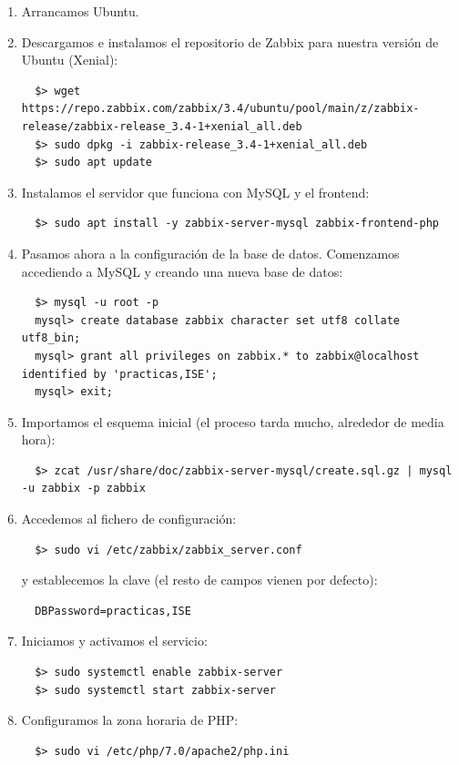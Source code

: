 \documentclass[12pt,spanish]{article}
\begin{document}
\begin{enumerate}
  \item Arrancamos Ubuntu.
  \item Descargamos e instalamos el repositorio de Zabbix para nuestra versión de Ubuntu (Xenial):
  \begin{lstlisting}
  $> wget https://repo.zabbix.com/zabbix/3.4/ubuntu/pool/main/z/zabbix-release/zabbix-release_3.4-1+xenial_all.deb
  $> sudo dpkg -i zabbix-release_3.4-1+xenial_all.deb
  $> sudo apt update
  \end{lstlisting}
  \item Instalamos el servidor que funciona con MySQL y el frontend:
  \begin{lstlisting}
  $> sudo apt install -y zabbix-server-mysql zabbix-frontend-php
  \end{lstlisting}
  \item Pasamos ahora a la configuración de la base de datos. Comenzamos accediendo a MySQL y creando una nueva base de datos:
  \begin{lstlisting}
  $> mysql -u root -p
  mysql> create database zabbix character set utf8 collate utf8_bin;
  mysql> grant all privileges on zabbix.* to zabbix@localhost identified by 'practicas,ISE';
  mysql> exit;
  \end{lstlisting}
  \item Importamos el esquema inicial (el proceso tarda mucho, alrededor de media hora):
  \begin{lstlisting}
  $> zcat /usr/share/doc/zabbix-server-mysql/create.sql.gz | mysql -u zabbix -p zabbix
  \end{lstlisting}
  \item Accedemos al fichero de configuración:
  \begin{lstlisting}
  $> sudo vi /etc/zabbix/zabbix_server.conf
  \end{lstlisting}
  y establecemos la clave (el resto de campos vienen por defecto):
  \begin{lstlisting}
  DBPassword=practicas,ISE
  \end{lstlisting}
  \item Iniciamos y activamos el servicio:
  \begin{lstlisting}
  $> sudo systemctl enable zabbix-server
  $> sudo systemctl start zabbix-server
  \end{lstlisting}
  \item Configuramos la zona horaria de PHP:
  \begin{lstlisting}
  $> sudo vi /etc/php/7.0/apache2/php.ini

\end{lstlisting}
\end{enumerate}
\end{document}
